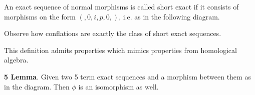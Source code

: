     \begin{remark}
        An exact sequence of normal morphisms is called short exact if it consists of morphisms on the form $(,0,i,p,0,)$, i.e. as in the following diagram.

        \begin{center}
        \end{center}

        Observe how conflations are exactly the class of short exact sequences.
    \end{remark}

    This definition admits properties which mimics properties from homological algebra.

    \begin{lemma}
        \textbf{5 Lemma}. Given two 5 term exact sequences and a morphism between them as in the diagram. Then $\phi$ is an isomorphism as well.
        \begin{center}
        \end{center}
    \end{lemma}


